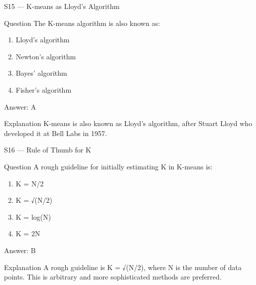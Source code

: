 \documentclass[aspectratio=169,8pt]{beamer}
\begin{document}
	\begin{frame}{S15 --- K-means as Lloyd's Algorithm}
		\begin{block}{Question}
			The K-means algorithm is also known as:
			\begin{enumerate}
				\item Lloyd's algorithm
				\item Newton's algorithm
				\item Bayes' algorithm
				\item Fisher's algorithm
			\end{enumerate}
		\end{block}
		\begin{exampleblock}{Answer: A}\end{exampleblock}
		\begin{block}{Explanation}
			K-means is also known as Lloyd's algorithm, after Stuart Lloyd who developed it at Bell Labs in 1957.
		\end{block}
	\end{frame}
	
	\begin{frame}{S16 --- Rule of Thumb for K}
		\begin{block}{Question}
			A rough guideline for initially estimating K in K-means is:
			\begin{enumerate}
				\item K = N/2
				\item K = √(N/2)
				\item K = log(N)
				\item K = 2N
			\end{enumerate}
		\end{block}
		\begin{exampleblock}{Answer: B}\end{exampleblock}
		\begin{block}{Explanation}
			A rough guideline is K = √(N/2), where N is the number of data points. This is arbitrary and more sophisticated methods are preferred.
		\end{block}
	\end{frame}
	
\end{document}
